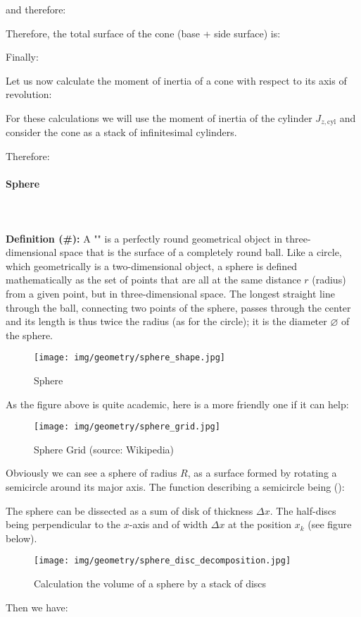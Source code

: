 {	and therefore:
	
	Therefore, the total surface of the cone (base + side surface) is:
	
	Finally:
	
	Let us now calculate the moment of inertia of a cone with respect to its axis of revolution:

	For these calculations we will use the moment of inertia of the cylinder $J_{z,\text{cyl}}$ and consider the cone as a stack of infinitesimal cylinders.
	
	Therefore:
	
	
	\pagebreak
	\paragraph{Sphere}\mbox{}\\\\
	\textbf{Definition (\#\mydef):} A "" is a perfectly round geometrical object in three-dimensional space that is the surface of a completely round ball. Like a circle, which geometrically is a two-dimensional object, a sphere is defined mathematically as the set of points that are all at the same distance $r$ (radius) from a given point, but in three-dimensional space. The longest straight line through the ball, connecting two points of the sphere, passes through the center and its length is thus twice the radius (as for the circle); it is the diameter $\varnothing$ of the sphere.
	\begin{figure}[H]
		\centering
		\texttt{[image: img/geometry/sphere\_shape.jpg]}
		\caption{Sphere}
	\end{figure}
	As the figure above is quite academic, here is a more friendly one if it can help:
	\begin{figure}[H]
		\centering
		\texttt{[image: img/geometry/sphere\_grid.jpg]}
		\caption{Sphere Grid (source: Wikipedia)}
	\end{figure}
	Obviously we can see a sphere of radius $R$, as a surface formed by rotating a semicircle around its major axis. The function describing a semicircle being ():
	
	The sphere can be dissected as a sum of disk of thickness $\Delta x$. The half-discs being perpendicular to the $x$-axis and of width $\Delta x$ at the position $x_k$  (see figure below).
	\begin{figure}[H]
		\centering
		\texttt{[image: img/geometry/sphere\_disc\_decomposition.jpg]}
		\caption{Calculation the volume of a sphere by a stack of discs}
	\end{figure}
	Then we have:
	
}
